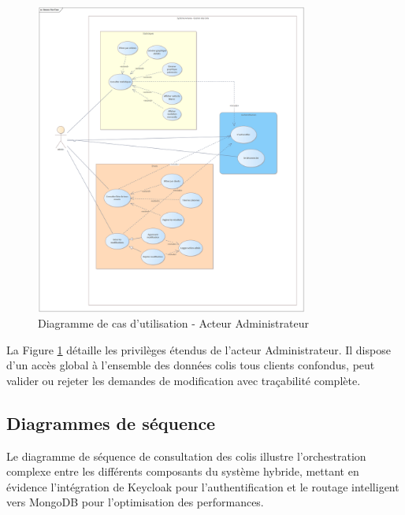 \begin{figure}[H]
\centering
\includegraphics[width=0.8\textwidth]{images/Amana Colis Use Case Admin.png}
\caption{Diagramme de cas d'utilisation - Acteur Administrateur}
\label{fig:use_case_admin}
\end{figure}

La Figure \ref{fig:use_case_admin} détaille les privilèges étendus de l'acteur Administrateur. Il dispose d'un accès global à l'ensemble des données colis tous clients confondus, peut valider ou rejeter les demandes de modification avec traçabilité complète.

\subsection{Diagrammes de séquence}

Le diagramme de séquence de consultation des colis illustre l'orchestration complexe entre les différents composants du système hybride, mettant en évidence l'intégration de Keycloak pour l'authentification et le routage intelligent vers MongoDB pour l'optimisation des performances.

